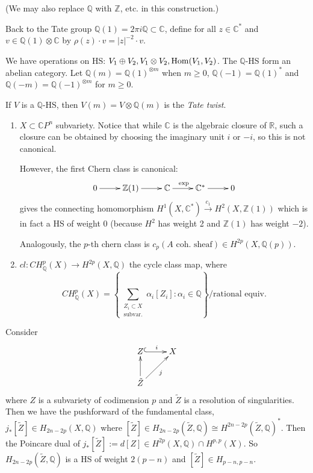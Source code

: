 (We may also replace $\mathbb{Q}$ with
$\mathbb{Z}$, etc. in this construction.)

\medskip\noindent
Back to the Tate group
$\mathbb{Q}(1)=2\pi i \mathbb{Q} \subset
\mathbb{C}$,
define for all $z \in \mathbb{C}^*$ and
$v \in \mathbb{Q}(1) \otimes \mathbb{C}$
by $\rho(z)\cdot v=|z|^{-2}\cdot v$.

We have operations on HS:
$V_1 \oplus V_2, V_1 \otimes V_2,
\mathop{\mathrm{Hom}}\nolimits(V_1,V_2)$.
The $\mathbb{Q}$-HS form an abelian category.
Let $\mathbb{Q}(m)=\mathbb{Q}(1)^{\otimes m}$
when $m \geq 0$,
$\mathbb{Q}(-1)=\mathbb{Q}(1)^*$
and $\mathbb{Q}(-m)=\mathbb{Q}(-1)^{\otimes
m}$
for $m \geq 0$.

If $V$ is a $\mathbb{Q}$-HS, then
$V(m)=V \otimes \mathbb{Q}(m)$
is the {\it Tate twist}.

\begin{example}
\label{example-chern-class}
\begin{enumerate}
\item $X \subset \mathbb{C}P^n$ subvariety.
Notice that while $\mathbb{C}$ is the
algebraic closure of $\mathbb{R}$,
such a closure can be obtained by
choosing the imaginary unit $i$ or $-i$,
so this is not canonical.

However, the first Chern class is canonical:
$$
\xymatrix{
0\ar[r]
&\mathbb{Z}(1)\ar[r]
&\mathbb{C}\ar[r]^{\text{exp}}
&\mathbb{C}^*\ar[r]
&0
}
$$
gives the connecting homomorphism
$H^1(X,\mathbb{C}^*
)\xrightarrow{c_1}H^2(X,\mathbb{Z}(1))$
which is in fact a HS of weight 0
(because $H^2$ has weight 2 and
$\mathbb{Z}(1)$ has
weight $-2$).

Analogously, the $p$-th chern class is
$c_p(A\text{ coh. sheaf}) \in
H^{2p}(X,\mathbb{Q}(p))$.

\item $cl:CH_\mathbb{Q}^p(X) \to
H^{2p}(X,\mathbb{Q})$
the cycle class map, where
$$
CH^p_\mathbb{Q}(X)=\left\{\sum_{\substack{Z_i
\subset X \\
\text{subvar.}}}\alpha_i[Z_i]:\alpha_i \in
\mathbb{Q}\right\}
\Big/\text{rational equiv.}
$$
\end{enumerate}
\end{example}

Consider
$$
\xymatrix{
Z\ar@{^(->}[r]^i& X\\
\tilde{Z} \ar[ur]_j\ar[u]
}
$$
where
$Z$ is a subvariety of codimension $p$ and
$\tilde{Z}$ is a resolution of singularities.
Then we have the pushforward of the
fundamental class,
$j_*[\tilde{Z}] \in H_{2n-2p}(X,\mathbb{Q})$
where $[\tilde{Z}]\in
H_{2n-2p}(\tilde{Z},\mathbb{Q})
\cong H^{2n-2p}(\tilde{Z}, \mathbb{Q})^*$.
Then the Poincare dual of
$j_*[\tilde{Z}]:=d[Z]
\in H^{2p}(X,\mathbb{Q}) \cap H^{p,p}(X)$.
So $H_{2n-2p}(\tilde{Z},\mathbb{Q})$
is a HS of weight $2(p-n)$
and  $[\tilde{Z}] \in H_{p-n,p-n}$.

